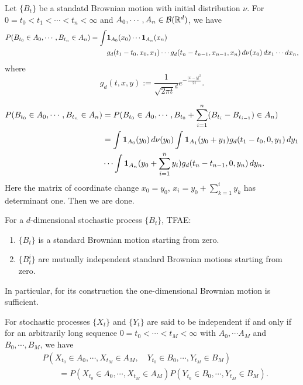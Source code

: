\documentclass{../../../small}
\begin{document}
\begin{prop}
Let $\{B_t\}$ be a standatd Brownian motion with initial distribution $\nu$.
For $0=t_0<t_1<\cdots<t_n<\infty$ and $A_0,\cdots,A_n\in\mathcal{B}(\mathbb{R}^d)$, we have
\begin{align*}
P(B_{t_0}\in A_0,\cdots,B_{t_n}\in A_n)=\int&\mathbf{1}_{A_0}(x_0)\cdots\mathbf{1}_{A_n}(x_n)\\&g_d(t_1-t_0,x_0,x_1)\cdots g_d(t_n-t_{n-1},x_{n-1},x_n)\,d\nu(x_0)\,dx_1\cdots dx_n,
\end{align*}
where
\[g_d(t,x,y):=\frac1{\sqrt{2\pi t}^d}e^{-\frac{|x-y|^2}{2t}}.\]
\end{prop}
\begin{pf}
\begin{align*}
P(B_{t_0}\in A_0,\cdots,B_{t_n}\in A_n)
&=P(B_{t_0}\in A_0,\cdots,B_{t_0}+\sum_{i=1}^n(B_{t_i}-B_{t_{i-1}})\in A_n)\\
&=\int\mathbf{1}_{A_0}(y_0)\,d\nu(y_0)\int\mathbf{1}_{A_1}(y_0+y_1)g_d(t_1-t_0,0,y_1)\,dy_1
\\&\cdots\int\mathbf{1}_{A_n}(y_0+\sum_{i=1}^ny_i)g_d(t_n-t_{n-1},0,y_n)\,dy_n.
\end{align*}
Here the matrix of coordinate change $x_0=y_0$, $x_i=y_0+\sum_{k=1}^iy_k$ has determinant one.
Then we are done.
\end{pf}

\begin{thm}
For a $d$-dimensional stochastic process $\{B_t\}$, TFAE:
\begin{enumerate}[(1)]
\item $\{B_t\}$ is a standard Brownian motion starting from zero.
\item $\{B_t^i\}$ are mutually independent standard Brownian motions starting from zero.
\end{enumerate}
In particular, for its construction the one-dimensional Brownian motion is sufficient.
\end{thm}
\begin{rmk*}
For stochastic processes $\{X_t\}$ and $\{Y_t\}$ are said to be independent if and only if for an arbitrarily long sequence $0=t_0<\cdots<t_M<\infty$ with $A_0,\cdots A_M$ and $B_0,\cdots, B_M$, we have
\begin{align*}
&P(X_{t_0}\in A_0,\cdots,X_{t_M}\in A_M,\quad Y_{t_0}\in B_0,\cdots,Y_{t_M}\in B_M)\\
&\qquad=P(X_{t_0}\in A_0,\cdots,X_{t_M}\in A_M)P(Y_{t_0}\in B_0,\cdots,Y_{t_M}\in B_M).
\end{align*}
\end{rmk*}
\end{document}
